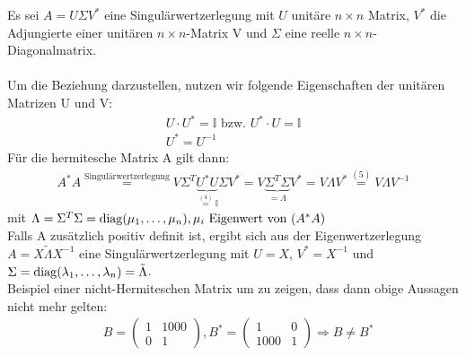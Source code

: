 Es sei $A=U\Sigma V^*$ eine Singulärwertzerlegung mit $U$ unitäre $n\times n$ Matrix, $V^*$ die Adjungierte einer unitären $n\times n$-Matrix V und $\Sigma$ eine reelle $n\times n$-Diagonalmatrix.\\\\
Um die Beziehung darzustellen, nutzen wir folgende Eigenschaften der unitären Matrizen U und V:
\begin{align}
U\cdot U^* =\mathbb{I} \text{ bzw. } U^* \cdot U=\mathbb{I}\\
U^*=U^{-1}
\end{align}
Für die hermitesche Matrix A gilt dann:
\begin{align}
A^*A\overset{\text{Singulärwertzerlegung}}{=} V\Sigma^T\underbrace{U^*U}_{\overset{(4)}{=}\mathbb{I}}\Sigma
V^* = V\underbrace{\Sigma^T\Sigma}_{=\Lambda}V^*=V\Lambda V^*\overset{(5)}{=}V\Lambda V^{-1}
\end{align}
mit $\Lambda=\Sigma^T \Sigma=\mathrm{diag}(\mu_1,\ldots,\mu_n), \mu_i \text{ Eigenwert von } (A^*A)$\\
\newline
Falls A zusätzlich positiv definit ist, ergibt sich aus der Eigenwertzerlegung $A=X\tilde{\Lambda} X^{-1}$ eine Singulärwertzerlegung mit $U=X$, $V^*=X^{-1}$ und $\Sigma=\mathrm{diag}(\lambda_1,\ldots,\lambda_n)=\tilde{\Lambda}$.\\
\newline
Beispiel einer nicht-Hermiteschen Matrix um zu zeigen, dass dann obige Aussagen nicht mehr gelten:
\begin{align*}
&B=
\begin{pmatrix}
	1 & 1000\\
	0 & 1
\end{pmatrix},
B^*=
\begin{pmatrix}
1 & 0\\
1000 & 1
\end{pmatrix}
\Rightarrow B\neq B^*\end{align*}
